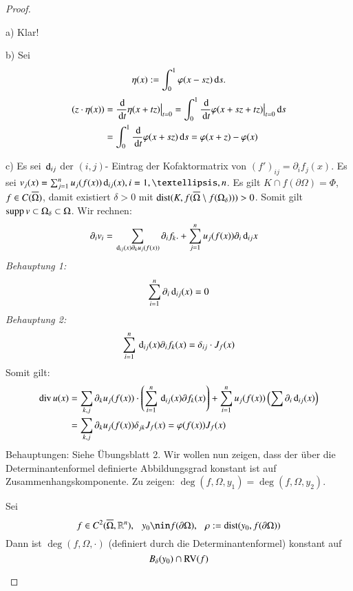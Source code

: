 \begin{proof}
    \begin{description}
    \item{a)}
    Klar!
    \item{b)}
    Sei
    \[
        \eta (x):= \int_0^1 \varphi (x-sz) \, \mathrm{d} s.
    \]
    \begin{align*}
        (z\cdot \eta(x))&=\frac{\, \mathrm{d}}{\, \mathrm{d} t } \eta (x+tz)\big|_{t=0}=\int_0^1 \frac{\, \mathrm{d}}{\, \mathrm{d} t} \varphi(x+sz+tz)
       \big|_{t=0} \, \mathrm{d} s\\
        &= \int_0^1 \frac{\, \mathrm{d}}{\, \mathrm{d} t} \varphi(x+sz)\, \mathrm{d} s=\varphi(x+z)-\varphi(x)
    \end{align*}
    \item{c)}
    Es sei $\, \mathrm{d} _{ij}$ der $(i,j)$- Eintrag der Kofaktormatrix von $(f')_{ij}= \partial _if_j(x)$.
    Es sei $v_j(x)=\sum_{j=1}^n u_j(f(x))\d _{ij}(x),i=1,…,n$. Es gilt $K\cap f(\partial \Omega) = \Phi$,
    $f\in C(\overline \Omega)$, damit existiert $\delta>0$ mit $\mathrm{dist}(K,f(\overline \Omega \setminus 
                f(\Omega_\delta)))>0$.
    Somit gilt $\mathrm{supp}\, v\subset \Omega_\delta\subset \Omega$.
    Wir rechnen:
    \begin{align*}
        \partial_iv_i&= \sum_{\, \mathrm{d} _{ij}(x)\partial_ku_j(f(x))}\partial _i f_k.+\sum_{j=1}^nu_j(f(x))
        \partial_i \, \mathrm{d}_{ij}x
    \end{align*}
    \textit{Behauptung 1:}
    \[
        \sum_{i=1}^n \partial_i\, \mathrm{d}_{ij}(x)=0
    \]
    \textit{Behauptung 2:}
    \[
        \sum_{i=1}^n \, \mathrm{d}_{ij} (x) \partial_if_k(x) =\delta_{ij}\cdot J_f(x)
    \]
    Somit gilt:
    \begin{align*}
        \mathrm{div}\, u(x)&=\sum_{k,j}\partial _k u_j(f(x))\cdot \left( \sum_{i=1}^n \, \mathrm{d}_{ij}(x) \partial f_k(x) 
                \right) +\sum_{i=1}^nu_j(f(x)) \left( \sum \partial _i \, \mathrm{d}_{ij}(x) \right)\\
        &=\sum_{k,j}\partial _k u_j(f(x))\delta _{jk} J_f(x)=\varphi(f(x))J_f(x)
    \end{align*}
    Behauptungen: Siehe Übungsblatt 2.
    Wir wollen nun zeigen, dass der über die Determinantenformel definierte Abbildungsgrad konstant
    ist auf Zusammenhangskomponente. Zu zeigen: $\deg(f,\Omega,y_1)=\deg(f,\Omega,y_2)$.

    \begin{lem}\label{2.8}
        Sei 
        \[
            f\in C^2(\ol\Omega,\R^n),\qq y_0\nin f(\partial\Omega),\qq\rho:=\dist(y_0,f(\partial \Omega))
        \]
        Dann ist $\deg(f,\Omega,\cdot)$ (definiert durch die Determinantenformel) konstant auf
        \[
            B_\delta (y_0)\cap \mathrm{RV}(f)
        \]
    \end{lem}


\end{description}
\end{proof}
